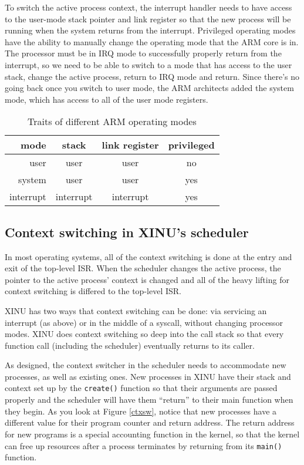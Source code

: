 \documentclass[12pt]{article}
\newcommand{\code}[1]{{\tt #1}}
\begin{document}
To switch the active process context, the interrupt handler needs to have
access to the user-mode stack pointer and link register so that the new process
will be running when the system returns from the interrupt.  Privileged
operating modes have the ability to manually change the operating mode that the
ARM core is in. The processor must be in IRQ mode to successfully properly
return from the interrupt, so we need to be able to switch to a mode that has
access to the user stack, change the active process, return to IRQ mode and
return. Since there's no going back once you switch to user mode, the ARM
architects added the system mode, which has access to all of the user mode
registers.

\begin{table}[h]
\caption{Traits of different ARM operating modes}
\label{arm-modes}
\center
\begin{tabular}{| r || c | c | c |}
\hline
mode & stack & link register & privileged \\\hline\hline
user & user & user & no \\\hline
system & user & user & yes \\\hline
interrupt & interrupt & interrupt & yes \\\hline
\end{tabular}
\end{table}

\subsection{Context switching in XINU's scheduler}
In most operating systems, all of the context switching is done at the entry
and exit of the top-level ISR. When the scheduler changes the active process,
the pointer to the active process' context is changed and all of the heavy
lifting for context switching is differed to the top-level ISR.

XINU has two ways that context switching can be done: via servicing an
interrupt (as above) or in the middle of a syscall, without changing processor
modes. XINU does context switching so deep into the call stack so that every
function call (including the scheduler) eventually returns to its caller.

As designed, the context switcher in the scheduler needs to accommodate new
processes, as well as existing ones. New processes in XINU have their stack and
context set up by the \code{create()} function so that their arguments are
passed properly and the scheduler will have them ``return'' to their main
function when they begin. As you look at Figure \ref{ctxsw}, notice that new
processes have a different value for their program counter and return address.
The return address for new programs is a special accounting function in the
kernel, so that the kernel can free up resources after a process terminates by
returning from its \code{main()} function.
\end{document}
